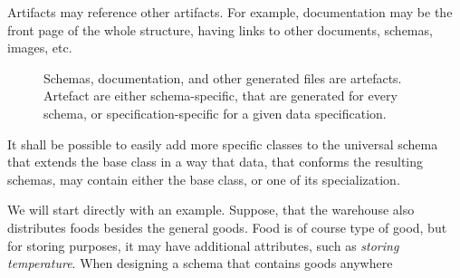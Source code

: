 Artifacts may reference other artifacts. For example, documentation may be the front page of the whole structure, having links to other documents, schemas, images, etc.

\begin{figure}[h!]\centering
  \caption{Schemas, documentation, and other generated files are artefacts. Artefact are either schema-specific, that are generated for every schema, or specification-specific for a given data specification.}
\end{figure}






\begin{requirement}
    It shall be possible to easily add more specific classes to the universal schema that extends the base class in a way that data, that conforms the resulting schemas, may contain either the base class, or one of its specialization.
\end{requirement}

\begin{showcase}
    We will start directly with an example. Suppose, that the warehouse also distributes foods besides the general goods. Food is of course type of good, but for storing purposes, it may have additional attributes, such as \textit{storing temperature}. When designing a schema that contains goods anywhere


\end{showcase}

